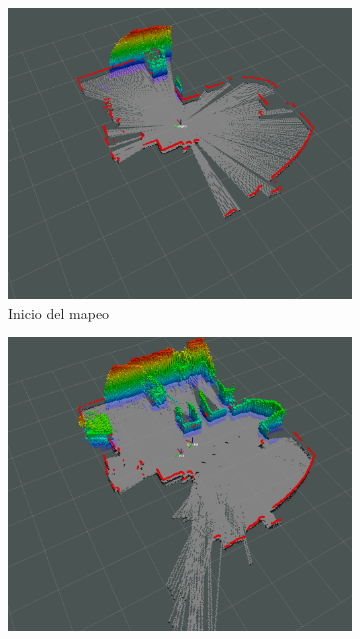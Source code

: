 \begin{figure}[H]
    \centering
    \begin{subfigure}[b]{0.30\textwidth}
    \includegraphics[width=\textwidth, height=\textwidth]{figures/05experimentacion/ambiente_3/r02_01.png}
    \caption{Inicio del mapeo}
    \label{fig:ambiente_3_1}
    \end{subfigure}
    \begin{subfigure}[b]{0.30\textwidth}
    \includegraphics[width=\textwidth, height=\textwidth]{figures/05experimentacion/ambiente_3/r02_02.png}

\end{subfigure}
\end{figure}
